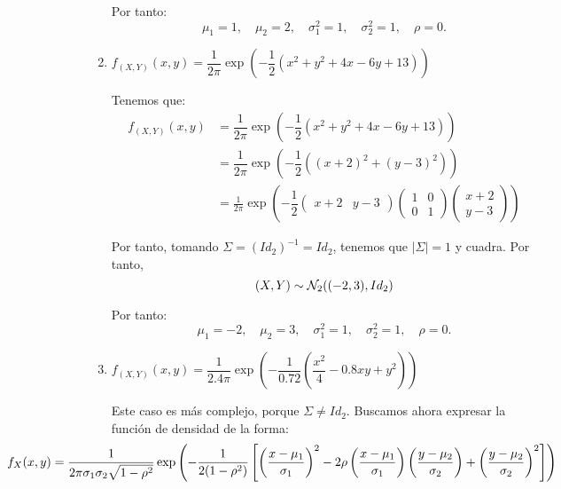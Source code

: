 \begin{ejercicio}
\begin{enumerate}
        Por tanto:
        \begin{equation*}
            \mu_1 = 1,\quad \mu_2 = 2,\quad \sigma_1^2 = 1,\quad \sigma_2^2 = 1,\quad \rho = 0.
        \end{equation*}

        \item $f_{(X,Y)}(x, y) = \dfrac{1}{2\pi}\exp\left(-\dfrac{1}{2}(x^2 +y^2 +4x-6y+13)\right)$
        
        Tenemos que:
        \begin{align*}
            f_{(X,Y)}(x, y) &= \dfrac{1}{2\pi}\exp\left(-\dfrac{1}{2}(x^2 +y^2 +4x-6y+13)\right)\\
            &= \dfrac{1}{2\pi}\exp\left(-\dfrac{1}{2}((x+2)^2 + (y-3)^2)\right)\\
            &= \frac{1}{2\pi}\exp\left(-\dfrac{1}{2}
            \begin{pmatrix}
                x+2&
                y-3
            \end{pmatrix}
            \begin{pmatrix}
                1 & 0\\
                0 & 1
            \end{pmatrix}
            \begin{pmatrix}
                x+2\\
                y-3
            \end{pmatrix}
            \right)
        \end{align*}

        Por tanto, tomando $\Sigma=(Id_2)^{-1}=Id_2$, tenemos que $|\Sigma|=1$ y cuadra. Por tanto,
        \begin{equation*}
            (X,Y)\sim \mathcal{N}_2((-2,3), Id_2)
        \end{equation*}

        Por tanto:
        \begin{equation*}
            \mu_1 = -2,\quad \mu_2 = 3,\quad \sigma_1^2 = 1,\quad \sigma_2^2 = 1,\quad \rho = 0.
        \end{equation*}
        \item $f_{(X,Y)}(x, y) = \dfrac{1}{2.4\pi}\exp\left(-\dfrac{1}{0.72}\left(\dfrac{x^2}{4} -0.8xy+y^2\right)\right)$
        
        Este caso es más complejo, porque $\Sigma\neq Id_2$. Buscamos ahora expresar la función de densidad de la forma:
        \begin{equation*}
            \hspace{-3cm}
            f_X(x,y)=\dfrac{1}{2\pi \sigma_1\sigma_2\sqrt{1-\rho^2}}\exp{\left(-\frac{1}{2(1-\rho^2)}\left[\left(\frac{x-\mu_1}{\sigma_1}\right)^2-2\rho\left(\frac{x-\mu_1}{\sigma_1}\right)\left(\frac{y-\mu_2}{\sigma_2}\right)+\left(\frac{y-\mu_2}{\sigma_2}\right)^2\right]\right)}
        \end{equation*}


\end{enumerate}
\end{ejercicio}
